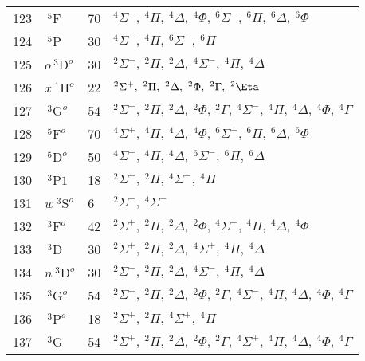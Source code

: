 \begin{table*}[]
\begin{tabular*}{\textwidth}{llll@{\extracolsep{\fill}}}
123 & $    ~^5\mathrm{F} $ &   70& $   ^{4}\Sigma^-,\  ^{4}\Pi,\     ^{4}\Delta,\ ^{4}\Phi,\   ^{6}\Sigma^-,\  ^{6}\Pi,\     ^{6}\Delta,\ ^{6}\Phi$ \\
124 & $    ~^5\mathrm{P} $ &   30& $   ^{4}\Sigma^-,\  ^{4}\Pi,\   ^{6}\Sigma^-,\  ^{6}\Pi$ \\
125 & $ o~^3\mathrm{D}^o $ &   30& $   ^{2}\Sigma^-,\  ^{2}\Pi,\     ^{2}\Delta,\   ^{4}\Sigma^-,\  ^{4}\Pi,\     ^{4}\Delta$ \\
126 & $ x~^1\mathrm{H}^o $ &   22& $   ^{2}\Sigma^+,\  ^{2}\Pi,\     ^{2}\Delta,\ ^{2}\Phi,\     ^{2}\Gamma,\ ^{2}\Eta$ \\
127 & $  ~^3\mathrm{G}^o $ &   54& $   ^{2}\Sigma^-,\  ^{2}\Pi,\     ^{2}\Delta,\ ^{2}\Phi,\     ^{2}\Gamma,\   ^{4}\Sigma^-,\  ^{4}\Pi,\     ^{4}\Delta,\ ^{4}\Phi,\     ^{4}\Gamma$ \\
128 & $  ~^5\mathrm{F}^o $ &   70& $   ^{4}\Sigma^+,\  ^{4}\Pi,\     ^{4}\Delta,\ ^{4}\Phi,\   ^{6}\Sigma^+,\  ^{6}\Pi,\     ^{6}\Delta,\ ^{6}\Phi$ \\
129 & $  ~^5\mathrm{D}^o $ &   50& $   ^{4}\Sigma^-,\  ^{4}\Pi,\     ^{4}\Delta,\   ^{6}\Sigma^-,\  ^{6}\Pi,\     ^{6}\Delta$ \\
130 & $   ~^3\mathrm{P1} $ &   18& $   ^{2}\Sigma^-,\  ^{2}\Pi,\   ^{4}\Sigma^-,\  ^{4}\Pi$ \\
131 & $ w~^3\mathrm{S}^o $ &    6& $   ^{2}\Sigma^-,\   ^{4}\Sigma^-$ \\
132 & $  ~^3\mathrm{F}^o $ &   42& $   ^{2}\Sigma^+,\  ^{2}\Pi,\     ^{2}\Delta,\ ^{2}\Phi,\   ^{4}\Sigma^+,\  ^{4}\Pi,\     ^{4}\Delta,\ ^{4}\Phi$ \\
133 & $    ~^3\mathrm{D} $ &   30& $   ^{2}\Sigma^+,\  ^{2}\Pi,\     ^{2}\Delta,\   ^{4}\Sigma^+,\  ^{4}\Pi,\     ^{4}\Delta$ \\
134 & $ n~^3\mathrm{D}^o $ &   30& $   ^{2}\Sigma^-,\  ^{2}\Pi,\     ^{2}\Delta,\   ^{4}\Sigma^-,\  ^{4}\Pi,\     ^{4}\Delta$ \\
135 & $  ~^3\mathrm{G}^o $ &   54& $   ^{2}\Sigma^-,\  ^{2}\Pi,\     ^{2}\Delta,\ ^{2}\Phi,\     ^{2}\Gamma,\   ^{4}\Sigma^-,\  ^{4}\Pi,\     ^{4}\Delta,\ ^{4}\Phi,\     ^{4}\Gamma$ \\
136 & $  ~^3\mathrm{P}^o $ &   18& $   ^{2}\Sigma^+,\  ^{2}\Pi,\   ^{4}\Sigma^+,\  ^{4}\Pi$ \\
137 & $    ~^3\mathrm{G} $ &   54& $   ^{2}\Sigma^+,\  ^{2}\Pi,\     ^{2}\Delta,\ ^{2}\Phi,\     ^{2}\Gamma,\   ^{4}\Sigma^+,\  ^{4}\Pi,\     ^{4}\Delta,\ ^{4}\Phi,\     ^{4}\Gamma$ \\

\end{tabular*}
\end{table*}
